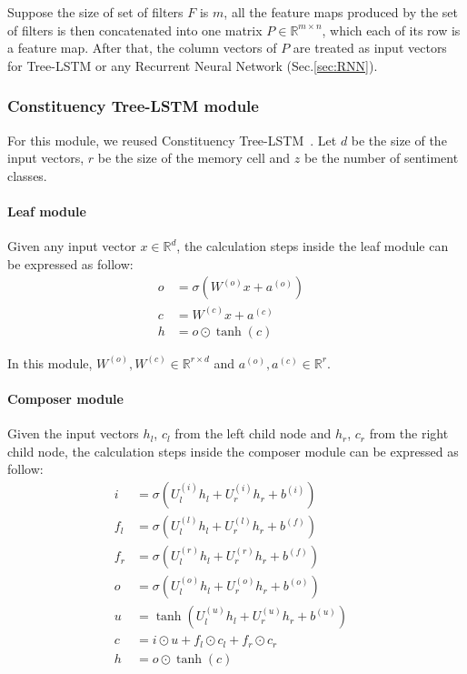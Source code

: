 Suppose the size of set of filters \(F\) is \(m\), all the feature maps produced by the set of filters is then concatenated into one matrix \(P \in \mathbb{R}^{m \times n}\), which each of its row is a feature map.
After that, the column vectors of \(P\) are treated as input vectors for Tree-LSTM or any Recurrent Neural Network (Sec.\ref{sec:RNN}).

\subsubsection{Constituency Tree-LSTM module}
For this module, we reused Constituency Tree-LSTM~\cite{treeLSTM}.
Let \(d\) be the size of the input vectors, \(r
\) be the size of the memory cell and \(z\) be the number of sentiment classes.

\paragraph{Leaf module}
Given any input vector \(x \in \mathbb{R}^d\), the calculation steps inside the leaf module can be expressed as follow:
\begin{align}
    o &= \sigma{\left( W^{(o)} x + a^{\left(o\right)}\right)} & \\
       c &= W^{(c)} x + a^{(c)} & \\
    h &= o \odot \tanh{\left(c\right)} &
\end{align}

In this module, \(W^{(o)}, W^{(c)} \in \mathbb{R}^{r \times d}\) and \(a^{\left(o\right)}, a^{(c)} \in \mathbb{R}^r\).

\paragraph{Composer module}
Given the input vectors \({h_l}\), \({c_l}\) from the left child node and \({h_r}\), \({c_r}\) from the right child node, the calculation steps inside the composer module can be expressed as follow:
\begin{align}
      i &= \sigma{ \left(U_l^{(i)} h_{l} + U_r^{(i)} h_{r} + b^{(i)} \right) } &\\
      f_{l} &= \sigma{\left(U_{l}^{(l)} h_{l} + U_{r}^{(l)} h_{r} + b^{(f)}\right)} & \\
      f_{r} &= \sigma{\left(U_{l}^{(r)} h_{l} + U_{r}^{(r)} h_{r} + b^{(f)}\right)} & \\
      o &= \sigma{\left( U_l^{(o)} h_{l} + U_r^{(o)} h_{r} + b^{(o)}\right)} &\\
      u &= \tanh{\left( U_l^{(u)} h_{l} + U_r^{(u)} h_{r} + b^{(u)}\right)} &\\
       c &= i \odot u + f_{l} \odot c_{l} + f_{r} \odot c_{r} & \\
    h &= o \odot \tanh{\left(c\right)} &
\end{align}


